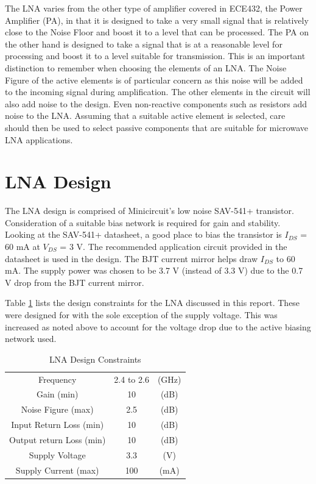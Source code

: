 \documentclass[conference]{IEEEtran}
\begin{document}
The LNA varies from the other type of amplifier covered in ECE432, the Power Amplifier (PA), in that it is designed to take a very small signal that is relatively close to the Noise Floor and boost it to a level that can be processed. The PA on the other hand is designed to take a signal that is at a reasonable level for processing and boost it to a level suitable for transmission. This is an important distinction to remember when choosing the elements of an LNA. The Noise Figure of the active elements is of particular concern as this noise will be added to the incoming signal during amplification. The other elements in the circuit will also add noise to the design. Even non-reactive components such as resistors add noise to the LNA. Assuming that a suitable active element is selected, care should then be used to select passive components that are suitable for microwave LNA applications.

\section{LNA Design}
The LNA design is comprised of Minicircuit's low noise SAV-541+ transistor. Consideration of a suitable bias network is required for gain and stability. Looking at the SAV-541+ datasheet\cite{sav541datasheet}, a good place to bias the transistor is $I_{DS}$ = 60 mA at $V_{DS}$ = 3 V. The recommended application circuit provided in the datasheet is used in the design. The BJT current mirror helps draw $I_{DS}$ to 60 mA. The supply power was chosen to be 3.7 V (instead of 3.3 V) due to the 0.7 V drop from the BJT current mirror.

Table \ref{tab:specs} lists the design constraints for the LNA discussed in this report. These were designed for with the sole exception of the supply voltage. This was increased as noted above to account for the voltage drop due to the active biasing network used. 

\begin{table}[!b]
\caption{LNA Design Constraints}
\centering
\begin{tabular}{c c c}
Frequency & 2.4 to 2.6 & (GHz)\\
Gain (min) & 10 & (dB)\\
Noise Figure (max) & 2.5 & (dB)\\
Input Return Loss (min) & 10 & (dB)\\
Output return Loss (min) & 10 & (dB)\\
Supply Voltage & 3.3 & (V)\\
Supply Current (max) & 100 & (mA)\\
\end{tabular}
\label{tab:specs}
\end{table}
\end{document}
